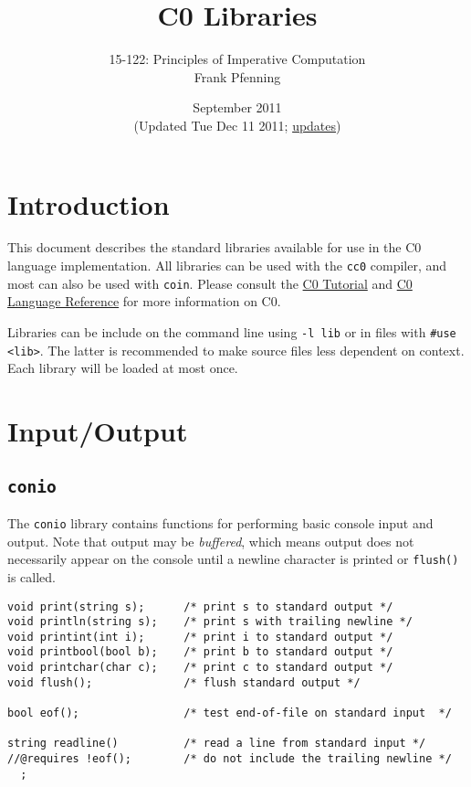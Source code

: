 \documentclass[11pt]{article}
\title{C0 Libraries}
\author{15-122: Principles of Imperative Computation \\ Frank Pfenning}
\date{September 2011\\(Updated Tue Dec 11 2011;
  \hyperlink{sec:updates}{updates})}
\begin{document}
\maketitle

\section{Introduction}

This document describes the standard libraries available for use
in the C0 language implementation.  All libraries can be used
with the \verb'cc0' compiler, and most can also be used with
\verb'coin'.   Please consult the
\href{http://c0.typesafety.net/tutorial}{C0 Tutorial} and
\href{http://c0.typesafety.net/doc/c0-reference.pdf}{C0 Language
Reference} for more information on C0.

Libraries can be include on the command line using \verb'-l lib' or in
files with \verb'#use <lib>'.  The latter is recommended to make
source files less dependent on context.  Each library will be loaded
at most once.

\section{Input/Output}

\subsection{\tt conio}

The \verb'conio' library contains functions for performing basic
console input and output.  Note that output may be \emph{buffered},
which means output does not necessarily appear on the console
until a newline character is printed or \verb'flush()' is called.

\begin{small}
\begin{verbatim}
void print(string s);      /* print s to standard output */
void println(string s);    /* print s with trailing newline */
void printint(int i);      /* print i to standard output */
void printbool(bool b);    /* print b to standard output */
void printchar(char c);    /* print c to standard output */
void flush();              /* flush standard output */

bool eof();                /* test end-of-file on standard input  */

string readline()          /* read a line from standard input */
//@requires !eof();        /* do not include the trailing newline */
  ;
\end{verbatim}
\end{small}
\end{document}
